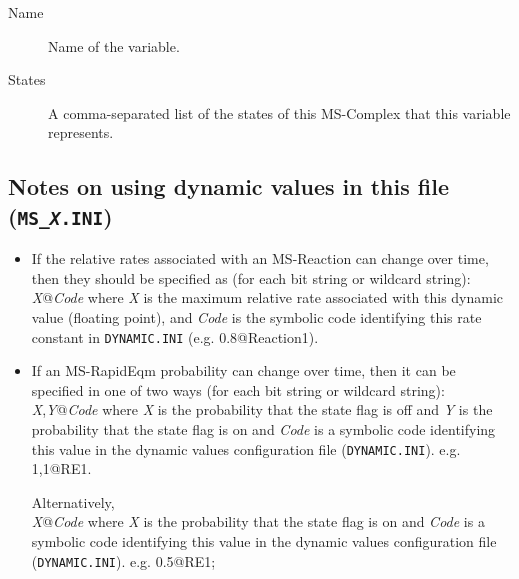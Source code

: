 \begin{description}
\item[Name] Name of the variable.
\item[States] A comma-separated list of the states of this MS-Complex
  that this variable represents.
\end{description}

\subsection{Notes on using dynamic values in this file (\texttt{MS\_\emph{X}.INI})}
\begin{itemize}
\item If the relative rates associated with an MS-Reaction can change
  over time, then they should be specified as (for each bit
  string or wildcard string):\\[\baselineskip]
  \emph{X}@\emph{Code} where \emph{X} is the maximum relative rate
  associated with this dynamic value (floating point), and \emph{Code}
  is the symbolic code identifying this rate constant in \texttt{DYNAMIC.INI}
  (e.g.  0.8@Reaction1).\par
  
\item If an MS-RapidEqm probability can change over time, then it can
  be specified in one of two ways (for each bit string or
  wildcard string): \\[\baselineskip]
  \emph{X},\emph{Y}@\emph{Code} where \emph{X} is the probability that
  the state flag is off and \emph{Y} is the probability that the state
  flag is on and \emph{Code} is a symbolic code identifying this value
  in the dynamic values configuration file (\texttt{DYNAMIC.INI}).  e.g.
  1,1@RE1.\par
  Alternatively,\\[\baselineskip]
  \emph{X}@\emph{Code} where \emph{X} is the probability that the
  state flag is on and \emph{Code} is a symbolic code identifying this
  value in the dynamic values configuration file (\texttt{DYNAMIC.INI}).  e.g.
  0.5@RE1;
\end{itemize}

